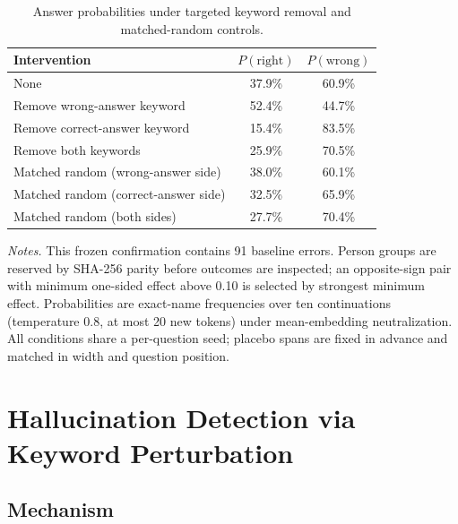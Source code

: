 \begin{table}[t]
\centering
\caption{Answer probabilities under targeted keyword removal and matched-random controls.}
\label{tab:joint-keyword-interventions}
\small
\setlength{\tabcolsep}{6pt}
\begin{tabular}{lcc}
\toprule
Intervention & $P(\mathrm{right})$ & $P(\mathrm{wrong})$ \\
\midrule
None                                  & 37.9\% & 60.9\% \\
Remove wrong-answer keyword           & 52.4\% & 44.7\% \\
Remove correct-answer keyword         & 15.4\% & 83.5\% \\
Remove both keywords                  & 25.9\% & 70.5\% \\
\midrule
Matched random (wrong-answer side)    & 38.0\% & 60.1\% \\
Matched random (correct-answer side)  & 32.5\% & 65.9\% \\
Matched random (both sides)           & 27.7\% & 70.4\% \\
\bottomrule
\end{tabular}

\vspace{2pt}
\begin{minipage}{0.94\linewidth}
\footnotesize
\textit{Notes.}
This frozen confirmation contains 91 baseline errors. Person groups are reserved
by SHA-256 parity before outcomes are inspected; an opposite-sign pair with
minimum one-sided effect above 0.10 is selected by strongest minimum effect.
Probabilities are exact-name frequencies over ten continuations (temperature
0.8, at most 20 new tokens) under mean-embedding neutralization. All conditions
share a per-question seed; placebo spans are fixed in advance and matched in
width and question position.
\end{minipage}
\end{table}




\section{Hallucination Detection via Keyword Perturbation}
\label{sec:detection}
\subsection{Mechanism}
